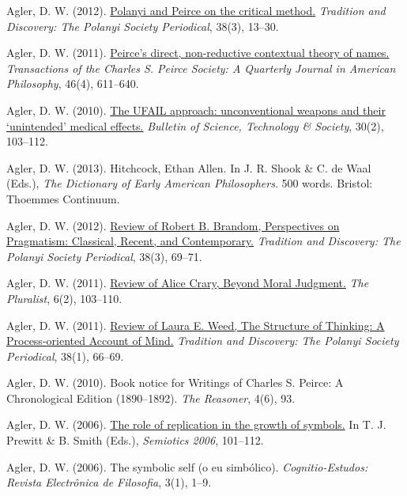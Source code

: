 \documentclass[p1noheader, 11pt, darkmode]{lightcv}
\begin{document}
\begin{rlist}[Publications]
    \item Agler, D. W. (2012). \href{https://philpapers.org/rec/AGLPAP}{Polanyi and Peirce on the critical method.} \textit{Tradition and Discovery: The Polanyi Society Periodical}, 38(3), 13–30.
    \item Agler, D. W. (2011). \href{https://muse.jhu.edu/article/419995}{Peirce’s direct, non-reductive contextual theory of names.} \textit{Transactions of the Charles S. Peirce Society: A Quarterly Journal in American Philosophy}, 46(4), 611–640.
    \item Agler, D. W. (2010). \href{https://doi.org/10.1177/0270467610361230}{The UFAIL approach: unconventional weapons and their ‘unintended’ medical effects.} \textit{Bulletin of Science, Technology \& Society}, 30(2), 103–112.
    \item Agler, D. W. (2013). Hitchcock, Ethan Allen. In J. R. Shook \& C. de Waal (Eds.), \textit{The Dictionary of Early American Philosophers}. 500 words. Bristol: Thoemmes Continuum.
    \item Agler, D. W. (2012). \href{https://philpapers.org/rec/AGLPOP-2}{Review of Robert B. Brandom, Perspectives on Pragmatism: Classical, Recent, and Contemporary.} \textit{Tradition and Discovery: The Polanyi Society Periodical}, 38(3), 69–71.
    \item Agler, D. W. (2011). \href{https://philpapers.org/rec/AGLBMJ-2}{Review of Alice Crary, Beyond Moral Judgment.} \textit{The Pluralist}, 6(2), 103–110.
    \item Agler, D. W. (2011). \href{https://doi.org/10.5840/traddisc2011/201238115}{Review of Laura E. Weed, The Structure of Thinking: A Process-oriented Account of Mind.} \textit{Tradition and Discovery: The Polanyi Society Periodical}, 38(1), 66–69.
    \item Agler, D. W. (2010). Book notice for Writings of Charles S. Peirce: A Chronological Edition (1890–1892). \textit{The Reasoner}, 4(6), 93.
    \item Agler, D. W. (2006). \href{https://www.pdcnet.org/pdc/bvdb.nsf/purchase?openform&fp=cpsem&id=cpsem_2006_0101_0112}{The role of replication in the growth of symbols.} In T. J. Prewitt \& B. Smith (Eds.), \textit{Semiotics 2006}, 101–112.
    \item Agler, D. W. (2006). The symbolic self (o eu simbólico). \textit{Cognitio-Estudos: Revista Electrônica de Filosofia}, 3(1), 1–9.
\end{rlist}
\end{document}
